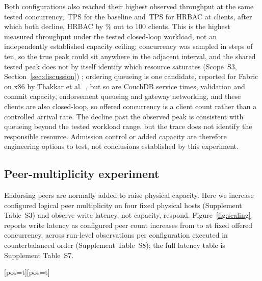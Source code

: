 \documentclass[a4paper,fleqn]{cas-sc}
\makeatletter
\newenvironment{widefig}[1][pos=t]
  {\ifdoublecol \@nameuse{figure*}[#1]\else \@nameuse{figure}[#1]\fi}
  {\ifdoublecol \@nameuse{endfigure*}\else \@nameuse{endfigure}\fi}
\makeatother
\begin{document}
Both configurations also reached their highest observed throughput at the
same tested concurrency, \PeakBaselineTPS\,TPS for the baseline and
\PeakHrbacTPS\,TPS for HRBAC at \KneeClients{} clients, after which both
decline, HRBAC by \PostKneeDeclinePct\% out to 100 clients. This is the
highest measured throughput under the tested closed-loop workload, not an
independently established capacity ceiling; concurrency was sampled in
steps of ten, so the true peak could sit anywhere in the adjacent
interval, and the shared tested peak does not by itself identify which
resource saturates (Scope~S3, Section~\ref{sec:discussion}) ;
ordering queueing is one candidate, reported for Fabric on x86 by
Thakkar et al.~\cite{thakkar2018performance}, but so are CouchDB service
times, validation and commit capacity, endorsement queueing and gateway
networking, and these clients are also closed-loop, so offered
concurrency is a client count rather than a controlled arrival rate. The
decline past the observed peak is consistent with queueing beyond the
tested workload range, but the trace does not identify the responsible
resource. Admission control or added capacity are therefore engineering
options to test, not conclusions established by this experiment.

\subsection{Peer-multiplicity experiment}
\label{subsec:scaling}

Endorsing peers are normally added to raise physical capacity. Here we
increase configured logical peer multiplicity on four fixed physical
hosts (Supplement Table~S3) and observe write latency, not capacity,
respond. Figure~\ref{fig:scaling} reports write latency as configured peer
count increases from \ScaleMinPeers{} to \ScaleMaxPeers{} at fixed offered
concurrency, across \PartRunsPerConfig{} run-level observations per
configuration executed in counterbalanced order (Supplement Table~S8); the
full latency table is Supplement Table~S7.

\begin{widefig}
\centering
{}
\caption{Run-level write latency and 95\% confidence intervals by configured logical peer count.}
\label{fig:scaling}
\end{widefig}
\end{document}
